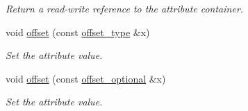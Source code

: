 \begin{DoxyCompactItemize}
\begin{DoxyCompactList}\small\item\em Return a read-\/write reference to the attribute container. \end{DoxyCompactList}\item 
void \hyperlink{classDataArray__t_ac133def4ed8ae6c623d0144f036a18d7}{offset} (const \hyperlink{classDataArray__t_a7b840c5f08bd2c65cd3c5e24ad132cfb}{offset\-\_\-type} \&x)
\begin{DoxyCompactList}\small\item\em Set the attribute value. \end{DoxyCompactList}\item 
void \hyperlink{classDataArray__t_a5abb95d7ab6fb95015c06de57a6ccbc9}{offset} (const \hyperlink{classDataArray__t_a4bc33060e7c386b658c752347ac5f03e}{offset\-\_\-optional} \&x)
\begin{DoxyCompactList}\small\item\em Set the attribute value. \end{DoxyCompactList}\end{DoxyCompactItemize}

